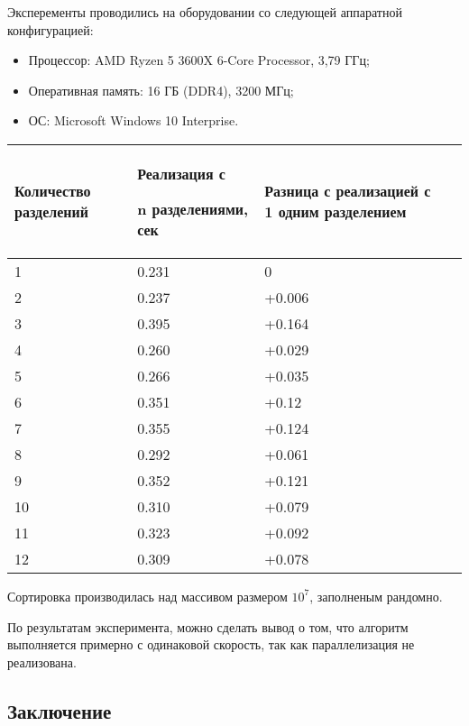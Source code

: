 \documentclass{report}
\begin{document}
Эксперементы проводились на оборудовании со следующей аппаратной конфигурацией:
\begin{itemize}
\item Процессор: AMD Ryzen 5 3600X 6-Core Processor, 3,79 ГГц;
\item Оперативная память: 16 ГБ (DDR4), 3200 МГц;
\item ОС: Microsoft Windows 10 Interprise.
\end{itemize}
\begin{table}[h]
    \begin{tabular}{ | p{4cm} | p{4cm} | p{4cm} | p{4cm} | }
    \hline
    Количество разделений & Реализация с \par n разделениями, сек & Разница с реализацией с 1 одним разделением\\ \hline
    1    & 0.231  &0 \\ \hline
    2    & 0.237  &+0.006 \\ \hline
    3    & 0.395  &+0.164 \\ \hline
    4    & 0.260  &+0.029 \\ \hline
    5    & 0.266  &+0.035 \\ \hline 
    6    & 0.351  &+0.12 \\ \hline
    7    & 0.355  &+0.124 \\ \hline
    8    & 0.292  &+0.061 \\ \hline
    9    & 0.352  &+0.121 \\ \hline
    10   & 0.310  &+0.079 \\ \hline
    11   & 0.323  &+0.092 \\ \hline
    12   & 0.309  &+0.078 \\ \hline
    \end{tabular}
\end{table}
\par Сортировка производилась над массивом размером $10^7$, заполненым рандомно.
\par По результатам эксперимента, можно сделать вывод о том, что алгоритм выполняется примерно с одинаковой скорость, так как параллелизация не реализована.

\newpage
\begin{center}
\section*{Заключение}
\end{center}
\end{document}
